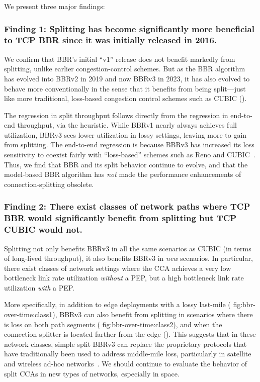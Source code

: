 We present three major findings:

\subsubsection{Finding 1: Splitting has become significantly more beneficial to
 TCP BBR since it was initially released in 2016.}

We confirm that BBR's initial ``v1'' release does not benefit markedly from splitting, unlike earlier
congestion-control schemes. But as the BBR algorithm
has evolved into BBRv2 in 2019 and now BBRv3 in 2023, it has also evolved to
behave more conventionally in the sense that it benefits from being
split---just like more traditional, loss-based congestion control schemes such
as CUBIC ().

The regression in split throughput follows directly from the regression
in end-to-end throughput, via the heuristic. While BBRv1 nearly always achieves
full utilization, BBRv3 sees lower utilization in lossy
settings, leaving more to gain from splitting.
The end-to-end regression is because BBRv3 has increased its loss sensitivity
to coexist fairly with ``loss-based'' schemes such as Reno and
CUBIC~\cite{cardwell2024bbrv3-ietf119,ware2019modeling,zeynali2024promises}.
Thus, we find that BBR and its split behavior continue
to evolve, and that the model-based BBR algorithm has \textit{not} made the
performance enhancements of connection-splitting obsolete.

\subsubsection{Finding 2: There exist classes of network paths where TCP BBR
 would significantly benefit from splitting but TCP CUBIC would not.}

Splitting not only benefits BBRv3 in all the same scenarios as CUBIC (in terms
of long-lived throughput), it also benefits BBRv3 in \textit{new} scenarios. In
particular, there exist classes of network settings where the CCA achieves a
very low bottleneck link rate utilization \textit{without} a PEP, but a high
bottleneck link rate utilization \textit{with} a PEP.

More specifically, in addition to edge deployments with a lossy last-mile (\Cref
{fig:bbr-over-time:class1}), BBRv3 can also benefit from splitting in
scenarios where there is loss on both path segments (\Cref
{fig:bbr-over-time:class2}), and when the connection-splitter is located
farther from the edge (). This suggests that in
these network classes, simple split BBRv3 can replace the
proprietary protocols that have traditionally been used to address middle-mile
loss, particularly in satellite and wireless ad-hoc networks~\cite
{cloudsplitting2010,border2020evaluating,rfc3135}. We should continue to
evaluate the behavior of split CCAs in new types of networks, especially in
space.

